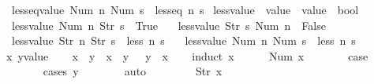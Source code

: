 \begin{isabellebody}
\ \ {\isachardoublequoteopen}less{\isacharunderscore}eq{\isacharunderscore}value\ {\isacharparenleft}Num\ n{\isacharparenright}\ {\isacharparenleft}Num\ s{\isacharparenright}\ {\isacharequal}\ less{\isacharunderscore}eq\ n\ s{\isachardoublequoteclose}\isanewline
\isanewline
{}\isamarkupfalse%
\ less{\isacharunderscore}value\ {\isacharcolon}{\isacharcolon}\ {\isachardoublequoteopen}value\ {\isasymRightarrow}\ value\ {\isasymRightarrow}\ bool{\isachardoublequoteclose}\ \isanewline
\ \ {\isachardoublequoteopen}less{\isacharunderscore}value\ {\isacharparenleft}Num\ n{\isacharparenright}\ {\isacharparenleft}Str\ s{\isacharparenright}\ {\isacharequal}\ True{\isachardoublequoteclose}\ {\isacharbar}\isanewline
\ \ {\isachardoublequoteopen}less{\isacharunderscore}value\ {\isacharparenleft}Str\ s{\isacharparenright}\ {\isacharparenleft}Num\ n{\isacharparenright}\ {\isacharequal}\ False{\isachardoublequoteclose}\ {\isacharbar}\isanewline
\ \ {\isachardoublequoteopen}less{\isacharunderscore}value\ {\isacharparenleft}Str\ n{\isacharparenright}\ {\isacharparenleft}Str\ s{\isacharparenright}\ {\isacharequal}\ less\ n\ s{\isachardoublequoteclose}\ {\isacharbar}\isanewline
\ \ {\isachardoublequoteopen}less{\isacharunderscore}value\ {\isacharparenleft}Num\ n{\isacharparenright}\ {\isacharparenleft}Num\ s{\isacharparenright}\ {\isacharequal}\ less\ n\ s{\isachardoublequoteclose}\isanewline
\isanewline
{}\isamarkupfalse%
%
\isadelimproof
\ %
\endisadelimproof
%
\isatagproof
{}\isamarkupfalse%
\isanewline
\ \ \isamarkupfalse%
\ x\ y{\isacharcolon}{\isacharcolon}{\isachardoublequoteopen}value{\isachardoublequoteclose}\isanewline
\ \ \isamarkupfalse%
\ {\isachardoublequoteopen}{\isacharparenleft}x\ {\isacharless}\ y{\isacharparenright}\ {\isacharequal}\ {\isacharparenleft}x\ {\isasymle}\ y\ {\isasymand}\ {\isasymnot}\ y\ {\isasymle}\ x{\isacharparenright}{\isachardoublequoteclose}\isanewline
\ \ \isamarkupfalse%
\ {\isacharparenleft}induct\ x{\isacharparenright}\isanewline
\ \ \ \ \isamarkupfalse%
\ {\isacharparenleft}Num\ x{\isacharparenright}\isanewline
\ \ \ \ \isamarkupfalse%
\ \isamarkupfalse%
\ {\isacharquery}case\isanewline
\ \ \ \ \ \ \isamarkupfalse%
\ {\isacharparenleft}cases\ y{\isacharparenright}\isanewline
\ \ \ \ \ \ \isamarkupfalse%
\ auto\isanewline
\ \ \isamarkupfalse%
\isanewline
\ \ \ \ \isamarkupfalse%
\ {\isacharparenleft}Str\ x{\isacharparenright}\isanewline

\end{isabellebody}
